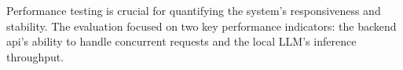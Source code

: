 Performance testing is crucial for quantifying the system's responsiveness and stability. The evaluation focused on two key performance indicators: the backend \acs{api}'s ability to handle concurrent requests and the local LLM's inference throughput.